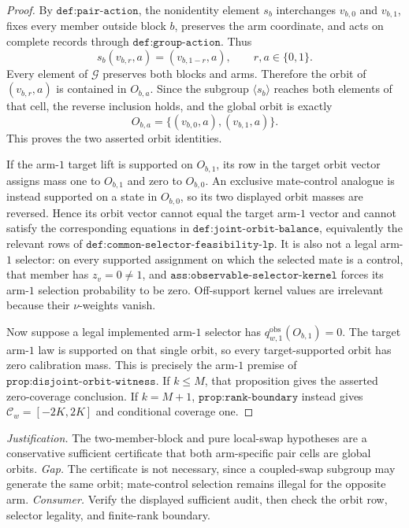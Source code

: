 \documentclass{article}
\begin{document}
\begin{proof}
By \(\texttt{def:pair-action}\), the nonidentity element \(s_b\) interchanges \(v_{b,0}\) and \(v_{b,1}\), fixes every member outside block \(b\), preserves the arm coordinate, and acts on complete records through \(\texttt{def:group-action}\). Thus
\[
s_b(v_{b,r},a)=(v_{b,1-r},a),\qquad r,a\in\{0,1\}.
\]
Every element of \(\mathcal G\) preserves both blocks and arms. Therefore the orbit of \((v_{b,r},a)\) is contained in \(O_{b,a}\). Since the subgroup \(\langle s_b\rangle\) reaches both elements of that cell, the reverse inclusion holds, and the global orbit is exactly
\[
O_{b,a}=\{(v_{b,0},a),(v_{b,1},a)\}.
\]
This proves the two asserted orbit identities.

If the arm-\(1\) target lift is supported on \(O_{b,1}\), its row in the target orbit vector assigns mass one to \(O_{b,1}\) and zero to \(O_{b,0}\). An exclusive mate-control analogue is instead supported on a state in \(O_{b,0}\), so its two displayed orbit masses are reversed. Hence its orbit vector cannot equal the target arm-\(1\) vector and cannot satisfy the corresponding equations in \(\texttt{def:joint-orbit-balance}\), equivalently the relevant rows of \(\texttt{def:common-selector-feasibility-lp}\). It is also not a legal arm-\(1\) selector: on every supported assignment on which the selected mate is a control, that member has \(z_v=0\ne1\), and \(\texttt{ass:observable-selector-kernel}\) forces its arm-\(1\) selection probability to be zero. Off-support kernel values are irrelevant because their \(\nu\)-weights vanish.

Now suppose a legal implemented arm-\(1\) selector has \(q^{\mathrm{obs}}_{w,1}(O_{b,1})=0\). The target arm-\(1\) law is supported on that single orbit, so every target-supported orbit has zero calibration mass. This is precisely the arm-\(1\) premise of \(\texttt{prop:disjoint-orbit-witness}\). If \(k\le M\), that proposition gives the asserted zero-coverage conclusion. If \(k=M+1\), \(\texttt{prop:rank-boundary}\) instead gives \(\mathcal C_w=[-2K,2K]\) and conditional coverage one.
\end{proof}
\par\smallskip\noindent \textit{Justification.} The two-member-block and pure local-swap hypotheses are a conservative sufficient certificate that both arm-specific pair cells are global orbits. \textit{Gap.} The certificate is not necessary, since a coupled-swap subgroup may generate the same orbit; mate-control selection remains illegal for the opposite arm. \textit{Consumer.} Verify the displayed sufficient audit, then check the orbit row, selector legality, and finite-rank boundary.
\end{document}

